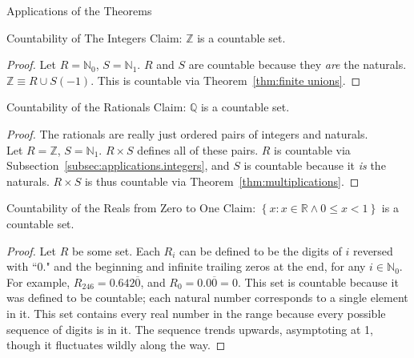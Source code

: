 \documentclass[12pt]{article}
\begin{document}
\pagebreak\begin{section}{Applications of the Theorems}\label{sec:applications}
	\begin{subsection}{Countability of The Integers}\label{subsec:applications.integers}
		Claim: $\mathbb Z$ is a countable set.
		\begin{proof}
			Let $R=\mathbb N_0$, $S=\mathbb N_1$. $R$ and $S$ are countable because they
			\emph{are} the naturals.\\
			$\mathbb Z\equiv R\cup S(-1)$. This is countable via Theorem~\ref{thm:finite unions}.
		\end{proof}
	\end{subsection}

	\begin{subsection}{Countability of the Rationals}\label{subsec:applications.rationals}
		Claim: $\mathbb Q$ is a countable set.
		\begin{proof}
			The rationals are really just ordered pairs of integers and naturals.\\
			Let $R=\mathbb Z$, $S=\mathbb N_1$. $R\times S$ defines all of these pairs.
			$R$ is countable via Subsection~\ref{subsec:applications.integers},
			and $S$ is countable because it \emph{is} the naturals. $R\times S$ is
			thus countable via Theorem~\ref{thm:multiplications}.
		\end{proof}
	\end{subsection}

	\begin{subsection}{Countability of the Reals from Zero to One}\label{subsec:applications.reals 0 to 1}
		Claim: $\left\{x:x\in\mathbb R\land0\le x<1\right\}$ is a countable set.
		\begin{proof}
			Let $R$ be some set. Each $R_i$ can be defined to be the digits of $i$
			reversed with ``0." and the beginning and infinite trailing zeros at the
			end, for any $i\in\mathbb N_0$. For example, $R_{246}=0.642\overline0$, and
			$R_0=0.0\overline0=0$. This set is countable because it was defined to be
			countable; each natural number corresponds to a single element in it. This
			set contains every real number in the range because every possible sequence
			of digits is in it. The sequence trends upwards, asymptoting at 1, though
			it fluctuates wildly along the way.
		\end{proof}
	\end{subsection}


\end{section}
\end{document}
